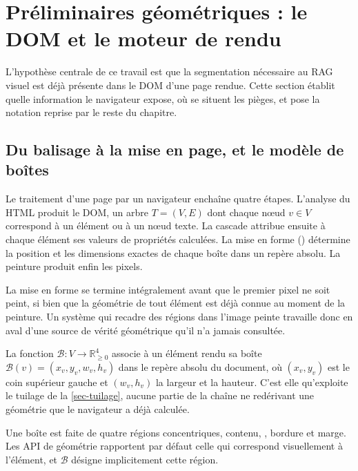 \section{Préliminaires géométriques : le DOM et le moteur de rendu}
\label{sec-rendu_dom}

L'hypothèse centrale de ce travail est que la segmentation nécessaire au RAG
visuel est déjà présente dans le DOM d'une page rendue. Cette section établit
quelle information le navigateur expose, où se situent les pièges, et pose la
notation reprise par le reste du chapitre.

\subsection{Du balisage à la mise en page, et le modèle de boîtes}
\label{sec-rendu_boites}

Le traitement d'une page par un navigateur enchaîne quatre étapes. L'analyse du
HTML produit le DOM, un arbre $T = (V, E)$ dont chaque nœud $v \in V$
correspond à un élément ou à un nœud texte. La cascade attribue ensuite à chaque
élément ses valeurs de propriétés calculées. La mise en forme ()
détermine la position et les dimensions exactes de chaque boîte dans un repère
absolu. La peinture produit enfin les pixels.

La mise en forme se termine intégralement avant que le premier pixel ne soit
peint, si bien que la géométrie de tout élément est déjà connue au moment de la
peinture. Un système qui recadre des régions
dans l'image peinte travaille donc en aval d'une source de vérité géométrique
qu'il n'a jamais consultée.

La fonction $\mathcal{B} : V \to \mathbb{R}_{\geq 0}^4$ associe à un élément
rendu sa boîte $\mathcal{B}(v) = (x_v, y_v, w_v, h_v)$ dans le repère absolu du
document, où $(x_v, y_v)$ est le coin supérieur gauche et $(w_v, h_v)$ la
largeur et la hauteur. C'est elle qu'exploite le tuilage de la
\cref{sec-tuilage}, aucune partie de la chaîne ne redérivant une géométrie que
le navigateur a déjà calculée.

Une boîte est faite de quatre régions concentriques, contenu,
, bordure et marge. Les API de géométrie rapportent par défaut
celle qui correspond visuellement à l'élément, et $\mathcal{B}$ désigne
implicitement cette région.

